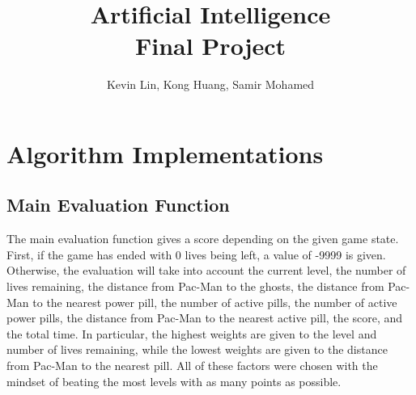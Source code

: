 \documentclass[a4paper,oneside,10pt]{report}
\begin{document}
\pagestyle{empty} %



\title{Artificial Intelligence \\ Final Project}
\author{Kevin Lin, Kong Huang, Samir Mohamed}
\maketitle



\tableofcontents %
\cleardoublepage %

\pagestyle{plain} %


\setcounter{page}{1}

\chapter{Algorithm Implementations}\label{implementations}

\section{Main Evaluation Function} \label{eval}

The main evaluation function gives a score depending on the given game state. First, if the game has ended with 0 lives being left, a value of -9999 is given. Otherwise, the evaluation will take into account the current level, the number of lives remaining, the distance from Pac-Man to the ghosts, the distance  from Pac-Man to the nearest power pill, the number of active pills, the number of active power pills, the distance from Pac-Man to the nearest active pill, the score, and the total time. In particular, the highest weights are given to the level and number of lives remaining, while the lowest weights are given to the distance from Pac-Man to the nearest pill. All of these factors were chosen with the mindset of beating the most levels with as many points as possible. 
\end{document}
